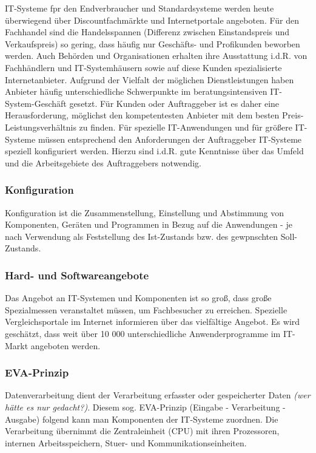 \documentclass[a4paper, 12pt]{report}
\begin{document}
IT-Systeme fpr den Endverbraucher und Standardsysteme werden heute überwiegend
über Discountfachmärkte und Internetportale angeboten. Für den Fachhandel sind 
die Handelsspannen (Differenz zwischen Einstandspreis und Verkaufspreis) so 
gering, dass häufig nur Geschäfts- und Profikunden beworben werden. Auch 
Behörden und Organisationen erhalten ihre Ausstattung i.d.R. von Fachhändlern
und IT-Systemhäusern sowie auf diese Kunden spezialisierte Internetanbieter. 
Aufgrund der Vielfalt der möglichen Dienstleistungen haben Anbieter häufig 
unterschiedliche Schwerpunkte im beratungsintensiven IT-System-Geschäft gesetzt. 
Für Kunden oder Auftraggeber ist es daher eine Herausforderung, möglichst den 
kompetentesten Anbieter mit dem besten Preis-Leistungsverhältnis zu finden. 
Für spezielle IT-Anwendungen und für größere IT-Systeme müssen entsprechend den 
Anforderungen der Auftraggeber IT-Systeme speziell konfiguriert werden. Hierzu 
sind i.d.R. gute Kenntnisse über das Umfeld und die Arbeitsgebiete des 
Auftraggebers notwendig. \\

\subsubsection{Konfiguration}

Konfiguration ist die Zusammenstellung, Einstellung und Abstimmung von 
Komponenten, Geräten und Programmen in Bezug auf die Anwendungen - je nach
Verwendung als Feststellung des Ist-Zustands bzw. des gewpnschten Soll-Zustands.

\subsubsection{Hard- und Softwareangebote}

Das Angebot an IT-Systemen und Komponenten ist so groß, dass große Spezialmessen
veranstaltet müssen, um Fachbesucher zu erreichen. Spezielle Vergleichsportale 
im Internet informieren über das vielfältige Angebot. Es wird geschätzt, dass 
weit über 10 000 unterschiedliche Anwenderprogramme im IT-Markt angeboten 
werden. 

\subsubsection{EVA-Prinzip}

Datenverarbeitung dient der Verarbeitung erfasster oder gespeicherter Daten 
\emph{(wer hätte es nur gedacht?)}. Diesem sog. EVA-Prinzip (Eingabe - 
Verarbeitung - Ausgabe) folgend kann man Komponenten der IT-Systeme zuordnen. 
Die Verarbeitung übernimmt die Zentraleinheit (CPU) mit ihren Prozessoren, 
internen Arbeitsspeichern, Stuer- und Kommunikationseinheiten. 
\end{document}
